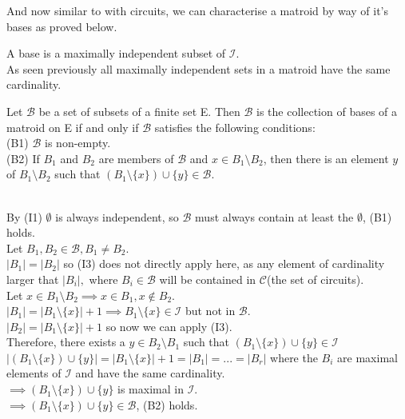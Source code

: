 \documentclass[../main.tex]{subfiles}
\begin{document}
\noindent And now similar to with circuits, we can characterise a matroid by way of it's bases as proved below. 
\begin{defn}
A base is a maximally independent subset of $\mathcal{I}.$\\
\noindent As seen previously all maximally independent sets in a matroid have the same cardinality.
\end{defn}

\begin{thm}
 Let $\mathcal{B}$ be a set of subsets of a finite set E. Then $\mathcal{B}$ is the collection of bases of a matroid on E if and only if $\mathcal{B}$ satisfies the following conditions:\\
 (B1) $\mathcal{B}$ is non-empty.\\
 (B2) If $B_1$ and $B_2$ are members of $\mathcal{B}$ and $x \in B_1 \setminus B_2$, then there is an element $y$ of $B_1 \setminus B_2$ such that $(B_1 \setminus \{x\}) \cup \{y\} \in \mathcal{B}$.
 \end{thm}

\noindent \Proof \\
\noindent By (I1) $\emptyset$ is always independent, so $\mathcal{B}$ must always contain at least the $\emptyset$, (B1) holds.\\
\noindent Let $B_1 ,B_2 \in \mathcal{B}, B_1 \neq B_2.$ \\
\noindent $|B_1| = |B_2|$ so (I3) does not directly apply here, as any element of cardinality larger that $|B_i|,$ where $B_i \in \mathcal{B}$ will be contained in $\mathcal{C}$(the set of circuits).\\
\noindent Let $x \in B_1 \setminus B_2 \implies x \in B_1, x \notin B_2.$\\
\noindent $|B_1| = |B_1 \setminus \{x\}| + 1 \implies B_1 \setminus \{x\} \in \mathcal{I}$ but not in $\mathcal{B}.$\\
\noindent $|B_2| = |B_1 \setminus \{x\}| + 1$ so now we can apply (I3).\\
\noindent Therefore, there exists a $y \in B_2 \setminus B_1$ such that $(B_1 \setminus \{x\}) \cup \{y\} \in \mathcal{I}$\\
$|(B_1 \setminus \{x\}) \cup \{y\}| = |B_1 \setminus \{x\}| + 1 = |B_1| = ... = |B_r|$ where the $B_i$ are maximal elements of $\mathcal{I}$ and have the same cardinality.\\ $\implies (B_1 \setminus \{x\}) \cup \{y\}$ is maximal in $\mathcal{I}.$\\
$\implies (B_1 \setminus \{x\}) \cup \{y\} \in \mathcal{B}$, (B2) holds.
\end{document}

